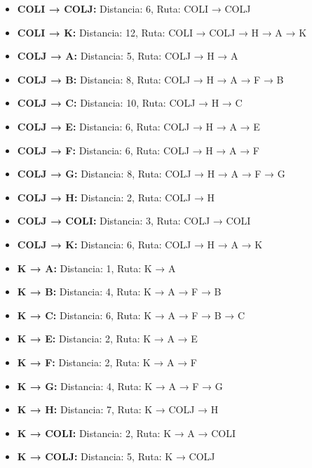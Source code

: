 \documentclass[12pt]{article}
\begin{document}
\begin{itemize}
\item \textbf{COLI → COLJ:} Distancia: 6, Ruta: COLI → COLJ
\item \textbf{COLI → K:} Distancia: 12, Ruta: COLI → COLJ → H → A → K
\item \textbf{COLJ → A:} Distancia: 5, Ruta: COLJ → H → A
\item \textbf{COLJ → B:} Distancia: 8, Ruta: COLJ → H → A → F → B
\item \textbf{COLJ → C:} Distancia: 10, Ruta: COLJ → H → C
\item \textbf{COLJ → E:} Distancia: 6, Ruta: COLJ → H → A → E
\item \textbf{COLJ → F:} Distancia: 6, Ruta: COLJ → H → A → F
\item \textbf{COLJ → G:} Distancia: 8, Ruta: COLJ → H → A → F → G
\item \textbf{COLJ → H:} Distancia: 2, Ruta: COLJ → H
\item \textbf{COLJ → COLI:} Distancia: 3, Ruta: COLJ → COLI
\item \textbf{COLJ → K:} Distancia: 6, Ruta: COLJ → H → A → K
\item \textbf{K → A:} Distancia: 1, Ruta: K → A
\item \textbf{K → B:} Distancia: 4, Ruta: K → A → F → B
\item \textbf{K → C:} Distancia: 6, Ruta: K → A → F → B → C
\item \textbf{K → E:} Distancia: 2, Ruta: K → A → E
\item \textbf{K → F:} Distancia: 2, Ruta: K → A → F
\item \textbf{K → G:} Distancia: 4, Ruta: K → A → F → G
\item \textbf{K → H:} Distancia: 7, Ruta: K → COLJ → H
\item \textbf{K → COLI:} Distancia: 2, Ruta: K → A → COLI
\item \textbf{K → COLJ:} Distancia: 5, Ruta: K → COLJ
\end{itemize}
\end{document}
